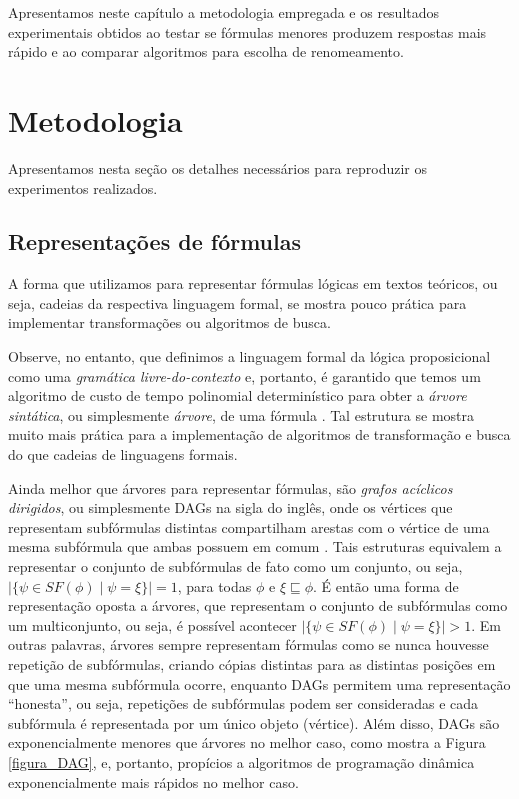 
\label{cap_resultados}

\indent

Apresentamos neste capítulo a metodologia empregada e os resultados experimentais obtidos ao testar se fórmulas menores produzem respostas mais rápido e ao comparar algoritmos para escolha de renomeamento.

\section{Metodologia}

\indent

Apresentamos nesta seção os detalhes necessários para reproduzir os experimentos realizados.

\subsection{Representações de fórmulas}

\indent

A forma que utilizamos para representar fórmulas lógicas em textos teóricos, ou seja, cadeias da respectiva linguagem formal, se mostra pouco prática para implementar transformações ou algoritmos de busca.

Observe, no entanto, que definimos a linguagem formal da lógica proposicional como uma \emph{gramática livre-do-contexto} \cite{sipser2012introduction} e, portanto, é garantido que temos um algoritmo de custo de tempo polinomial determinístico para obter a \emph{árvore sintática}, ou simplesmente \emph{árvore}, de uma fórmula \cite{younger1967recognition}. Tal estrutura se mostra muito mais prática para a implementação de algoritmos de transformação e busca do que cadeias de linguagens formais.

Ainda melhor que árvores para representar fórmulas, são \emph{grafos acíclicos dirigidos}, ou simplesmente DAGs na sigla do inglês, onde os vértices que representam subfórmulas distintas compartilham arestas com o vértice de uma mesma subfórmula que ambas possuem em comum \cite{jackson2004clause}. Tais estruturas equivalem a representar o conjunto de subfórmulas de fato como um conjunto, ou seja, $|\{\psi \in SF(\phi) \mid \psi = \xi \}| = 1$, para todas $\phi$ e $\xi \sqsubseteq \phi$. É então uma forma de representação oposta a árvores, que representam o conjunto de subfórmulas como um multiconjunto, ou seja, é possível acontecer $|\{\psi \in SF(\phi) \mid \psi = \xi \}| > 1$. Em outras palavras, árvores sempre representam fórmulas como se nunca houvesse repetição de subfórmulas, criando cópias distintas para as distintas posições em que uma mesma subfórmula ocorre, enquanto DAGs permitem uma representação ``honesta'', ou seja, repetições de subfórmulas podem ser consideradas e cada subfórmula é representada por um único objeto (vértice). Além disso, DAGs são exponencialmente menores que árvores no melhor caso, como mostra a Figura \ref{figura_DAG}, e, portanto, propícios a algoritmos de programação dinâmica \cite{bellman2015applied} exponencialmente mais rápidos no melhor caso.

